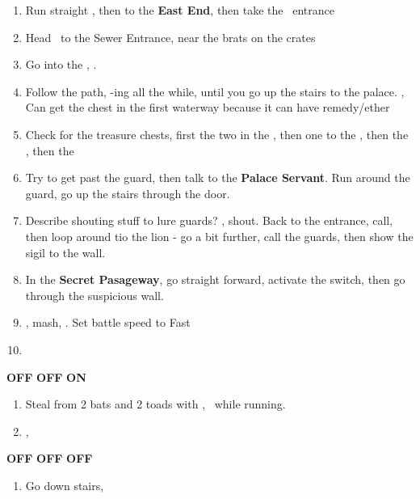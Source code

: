 \begin{enumerate}
	\item Run straight \north, then \north\west to the \textbf{East End}, then take the \lowtown\ entrance \north
	\item Head \north\east\ to the Sewer Entrance, near the brats on the crates
	\item Go into the \waterway, \cs. \save
	\item Follow the path, \flee-ing all the while, until you go up the stairs to the palace. \cs, \cs Can get the chest in the first waterway because it can have remedy/ether
	\item Check for the treasure chests, first the two in the \south\east, then one to the \west, then the \north\east, then the \north\west
	\item Try to get past the guard, then talk to the \textbf{Palace Servant}. Run around the guard, go up the stairs through the door.
	\item Describe shouting stuff to lure guards? \south\west, shout. Back to the entrance, call, then loop around tio the lion - go a bit further, call the guards, then show the sigil to the wall.
	\item In the \textbf{Secret Pasageway}, go straight forward, activate the switch, then go through the suspicious wall.
	\item \cs, mash, \cs. Set battle speed to Fast
	\item \leader{\fran}
\end{enumerate}
\begin{gambit}
	\begin{itemize}
		\vaanf \textbf{OFF}
		\franf \textbf{OFF}
		\balthierf \textbf{ON}
	\end{itemize}
\end{gambit}
\begin{enumerate}
	\item Steal from 2 bats and 2 toads with \vaan, \balthier\ while running.
	\item \save,
\end{enumerate}
\begin{gambit}
	\begin{itemize}
		\vaanf \textbf{OFF}
		\franf \textbf{OFF}
		\balthierf \textbf{OFF}
	\end{itemize}
\end{gambit}
\begin{enumerate}
	\item Go down stairs, \cs
\end{enumerate}
